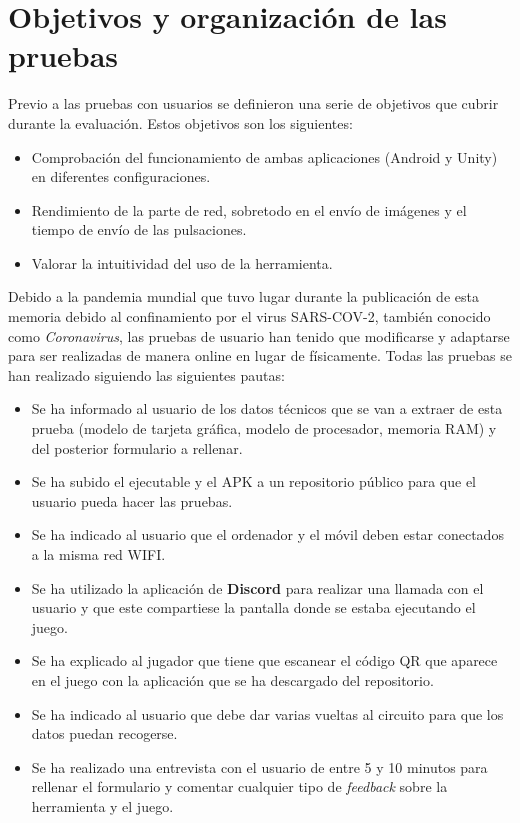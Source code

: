 \section{Objetivos y organizaci\'on de las pruebas}

Previo a las pruebas con usuarios se definieron una serie de objetivos que cubrir durante la evaluaci\'on. Estos objetivos son los siguientes:

\begin {itemize}
\item Comprobaci\'on del funcionamiento de ambas aplicaciones (Android y Unity) en diferentes configuraciones.
\item Rendimiento de la parte de red, sobretodo en el env\'io de im\'agenes y el tiempo de env\'io de las pulsaciones.
\item Valorar la intuitividad del uso de la herramienta.
\end {itemize}

Debido a la pandemia mundial que tuvo lugar durante la publicaci\'on de esta memoria debido al confinamiento por el virus SARS-COV-2, tambi\'en conocido como \textit{Coronavirus}, las pruebas de usuario han tenido que modificarse y adaptarse para ser realizadas de manera online en lugar de f\'isicamente. Todas las pruebas se han realizado siguiendo las siguientes pautas:

\begin {itemize}
\item Se ha informado al usuario de los datos t\'ecnicos que se van a extraer de esta prueba (modelo de tarjeta gr\'afica, modelo de procesador, memoria RAM) y del posterior formulario a rellenar.
\item Se ha subido el ejecutable y el APK a un repositorio p\'ublico para que el usuario pueda hacer las pruebas.
\item Se ha indicado al usuario que el ordenador y el m\'ovil deben estar conectados a la misma red WIFI.
\item Se ha utilizado la aplicaci\'on de \textbf{Discord} para realizar una llamada con el usuario y que este compartiese la pantalla donde se estaba ejecutando el juego.
\item Se ha explicado al jugador que tiene que escanear el c\'odigo QR que aparece en el juego con la aplicaci\'on que se ha descargado del repositorio.
\item Se ha indicado al usuario que debe dar varias vueltas al circuito para que los datos puedan recogerse. 
\item Se ha realizado una entrevista con el usuario de entre 5 y 10 minutos para rellenar el formulario y comentar cualquier tipo de \textit{feedback} sobre la herramienta y el juego.
\end {itemize}

